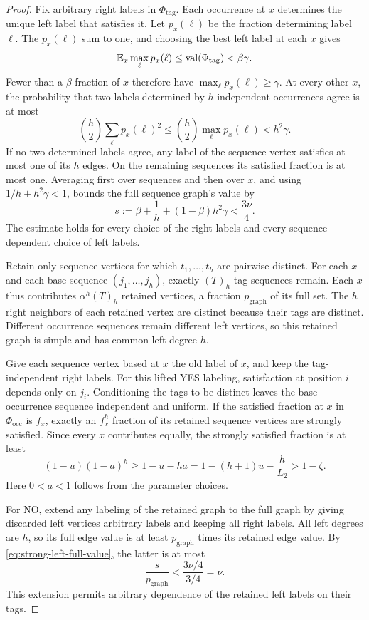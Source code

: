 \begin{proof}
Fix arbitrary right labels in \(\Phi_{\mathrm{tag}}\).  Each occurrence
at \(x\) determines the unique left label that satisfies it.  Let \(p_x(\ell)\)
be the fraction determining label \(\ell\).  The \(p_x(\ell)\) sum to
one, and choosing the best left label at each \(x\) gives
\[
 \mathbb E_x\max_\ell p_x(\ell)\le\operatorname{val}(\Phi_{\mathrm{tag}})<\beta\gamma.
\]
Fewer than a \(\beta\) fraction of \(x\) therefore have
\(\max_\ell p_x(\ell)\ge\gamma\).  At every other \(x\), the probability
that two labels determined by \(h\) independent occurrences agree is
at most
\[
 \binom h2\sum_\ell p_x(\ell)^2
 \le \binom h2\max_\ell p_x(\ell)<h^2\gamma.
\]
If no two determined labels agree, any label of the sequence vertex
satisfies at most one of its \(h\) edges.  On the remaining sequences
its satisfied fraction is at most one.  Averaging first over sequences
and then over \(x\), and using \(1/h+h^2\gamma<1\), bounds the full
sequence graph's value by
\begin{equation}
 s:=\beta+\frac1h+(1-\beta)h^2\gamma<\frac{3\nu}{4}.
\label{eq:strong-left-full-value}
\end{equation}
The estimate holds for every choice of the right labels and every
sequence-dependent choice of left labels.

Retain only sequence vertices for which \(t_1,\ldots,t_h\) are
pairwise distinct.  For each \(x\) and each base sequence
\((j_1,\ldots,j_h)\), exactly \((T)_h\) tag sequences remain.
Each \(x\) thus contributes \(\alpha^h(T)_h\) retained vertices, a
fraction \(p_{\mathrm{graph}}\) of its full set.  The \(h\) right
neighbors of each retained vertex are distinct because their tags are
distinct.  Different occurrence sequences remain different left
vertices, so this retained graph is simple and has common left degree
\(h\).

Give each sequence vertex based at \(x\) the old label of \(x\), and
keep the tag-independent right labels.  For this lifted YES labeling,
satisfaction at position \(i\) depends only on \(j_i\).  Conditioning
the tags to be distinct leaves the base occurrence sequence independent
and uniform.  If the satisfied fraction at \(x\) in
\(\Phi_{\mathrm{occ}}\) is \(f_x\), exactly an \(f_x^h\) fraction of
its retained sequence vertices are strongly satisfied.
Since every \(x\) contributes equally, the strongly satisfied fraction
is at least
\[
 (1-u)(1-a)^h
 \ge 1-u-ha
 =1-(h+1)u-\frac h{L_2}>1-\zeta.
\]
Here \(0<a<1\) follows from the parameter choices.

For NO, extend any labeling of the retained graph to the full graph by
giving discarded left vertices arbitrary labels and keeping all right
labels.  All left degrees are \(h\), so its full edge value is at least
\(p_{\mathrm{graph}}\) times its retained edge value.  By
\eqref{eq:strong-left-full-value}, the latter is at most
\[
 \frac{s}{p_{\mathrm{graph}}}<\frac{3\nu/4}{3/4}=\nu.
\]
This extension permits arbitrary dependence of the retained left
labels on their tags.


\end{proof}
